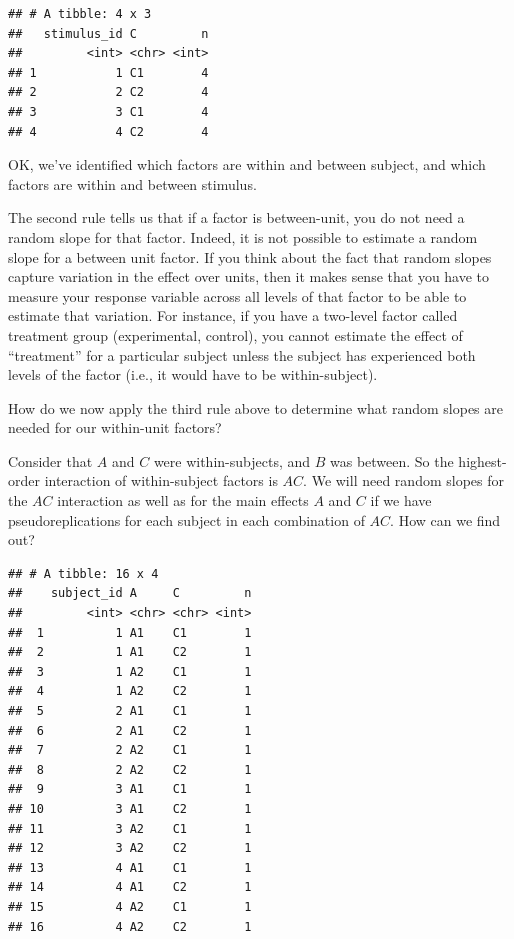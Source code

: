\documentclass[]{book}
\newenvironment{Shaded}{\begin{snugshade}}{\end{snugshade}}
\newcommand{\KeywordTok}[1]{\textcolor[rgb]{0.13,0.29,0.53}{\textbf{#1}}}
\newcommand{\NormalTok}[1]{#1}
\newcommand{\OperatorTok}[1]{\textcolor[rgb]{0.81,0.36,0.00}{\textbf{#1}}}
\newcommand{\StringTok}[1]{\textcolor[rgb]{0.31,0.60,0.02}{#1}}
\begin{document}
\begin{verbatim}
## # A tibble: 4 x 3
##   stimulus_id C         n
##         <int> <chr> <int>
## 1           1 C1        4
## 2           2 C2        4
## 3           3 C1        4
## 4           4 C2        4
\end{verbatim}

OK, we've identified which factors are within and between subject, and which factors are within and between stimulus.

The second rule tells us that if a factor is between-unit, you do not need a random slope for that factor. Indeed, it is not possible to estimate a random slope for a between unit factor. If you think about the fact that random slopes capture variation in the effect over units, then it makes sense that you have to measure your response variable across all levels of that factor to be able to estimate that variation. For instance, if you have a two-level factor called treatment group (experimental, control), you cannot estimate the effect of ``treatment'' for a particular subject unless the subject has experienced both levels of the factor (i.e., it would have to be within-subject).

How do we now apply the third rule above to determine what random slopes are needed for our within-unit factors?

Consider that \(A\) and \(C\) were within-subjects, and \(B\) was between. So the highest-order interaction of within-subject factors is \(AC\). We will need random slopes for the \(AC\) interaction as well as for the main effects \(A\) and \(C\) if we have pseudoreplications for each subject in each combination of \(AC\). How can we find out?

\begin{Shaded}
\end{Shaded}

\begin{verbatim}
## # A tibble: 16 x 4
##    subject_id A     C         n
##         <int> <chr> <chr> <int>
##  1          1 A1    C1        1
##  2          1 A1    C2        1
##  3          1 A2    C1        1
##  4          1 A2    C2        1
##  5          2 A1    C1        1
##  6          2 A1    C2        1
##  7          2 A2    C1        1
##  8          2 A2    C2        1
##  9          3 A1    C1        1
## 10          3 A1    C2        1
## 11          3 A2    C1        1
## 12          3 A2    C2        1
## 13          4 A1    C1        1
## 14          4 A1    C2        1
## 15          4 A2    C1        1
## 16          4 A2    C2        1
\end{verbatim}
\end{document}
